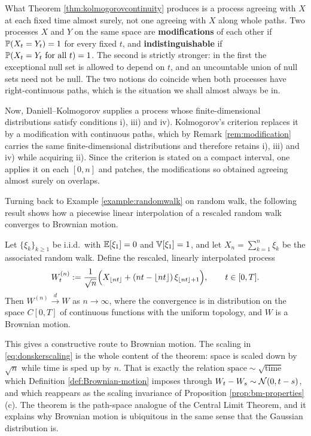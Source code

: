 \begin{remark}\label{rem:modification}
What Theorem \ref{thm:kolmogorovcontinuity} produces is a process agreeing with $X$ at each fixed
time almost surely, not one agreeing with $X$ along whole paths.
Two processes $X$ and $Y$ on the same space are \textbf{modifications} of each other if
$\mathbb{P}(X_t = Y_t) = 1$ for every fixed $t$, and \textbf{indistinguishable} if
$\mathbb{P}(X_t = Y_t \text{ for all } t) = 1$. The second is strictly stronger: in the first the
exceptional null set is allowed to depend on $t$, and an uncountable union of null sets need not be
null. The two notions do coincide when both processes have right-continuous paths, which is the
situation we shall almost always be in.
\end{remark}

Now, Daniell--Kolmogorov supplies a process whose finite-dimensional
distributions satisfy conditions i), iii) and
iv). Kolmogorov's criterion
replaces it by a modification with continuous paths, which by Remark \ref{rem:modification} carries
the same finite-dimensional distributions and therefore retains i), iii) and iv) while acquiring
ii). Since the criterion is stated on a compact interval, one applies it on each $[0,n]$ and patches,
the modifications so obtained agreeing almost surely on overlaps.

Turning back to Example
\ref{example:randomwalk} on random walk, the following result shows how a piecewise linear interpolation of a rescaled random walk converges to Brownian motion.

\begin{theorem}\label{thm:donsker}
Let $\{\xi_k\}_{k\geq1}$ be i.i.d.\ with $\mathbb{E}[\xi_1]=0$ and $\mathbb{V}[\xi_1]=1$, and let 
$X_n = \sum_{k=1}^n \xi_k$ be the associated random walk. Define the rescaled, linearly 
interpolated process
\begin{equation}\label{eq:donskerscaling}
W^{(n)}_t := \frac{1}{\sqrt{n}}\Bigl( X_{\lfloor nt \rfloor} + (nt - \lfloor nt \rfloor)\,\xi_{\lfloor nt\rfloor +1}\Bigr), \qquad t \in [0,T].
\end{equation}
Then $W^{(n)} \xrightarrow{d} W$ as $n \to \infty$, where the convergence is in distribution on the 
space $C[0,T]$ of continuous functions with the uniform topology, and $W$ is a Brownian motion. 
\qedopentext
\end{theorem}

This gives a constructive route to Brownian motion. The scaling in \eqref{eq:donskerscaling} is the whole content of the theorem: space is scaled down
by $\sqrt{n}$ while time is sped up by $n$. That is exactly the relation $\text{space} \sim 
\sqrt{\text{time}}$ which Definition \ref{def:Brownian-motion} imposes through 
$W_t - W_s \sim \mathcal{N}(0,t-s)$, and which reappears as the scaling invariance of Proposition 
\ref{prop:bm-properties}(c). The theorem is the path-space analogue of the Central Limit Theorem, and it explains why
Brownian motion is ubiquitous in the same sense that the Gaussian distribution is.

